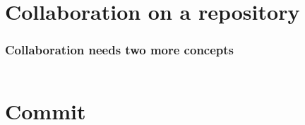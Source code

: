 \documentclass[aspectratio=169]{beamer} %
\newcommand{\trainingURL}[1]{{\color{blue}\url{#1}}}
\newcommand{\traininerUsername}{sakinashibuya}
\newcommand{\repoName}{\traininerUsername/lyrics_creb_F2022}
\newcommand{\trainingRepoURL}[1]{\trainingURL{https://github.com/\repoName #1}}
\begin{document}
%
%
%
%
%
%
%
%

\section{Collaboration on a repository}

\begin{frame}
\frametitle{Collaboration needs two more concepts}


	\vspace{1cm}

	\begin{columns}[c]



	\end{columns}

	\vspace{2cm}

\end{frame}

\section{Commit}
\end{document}
